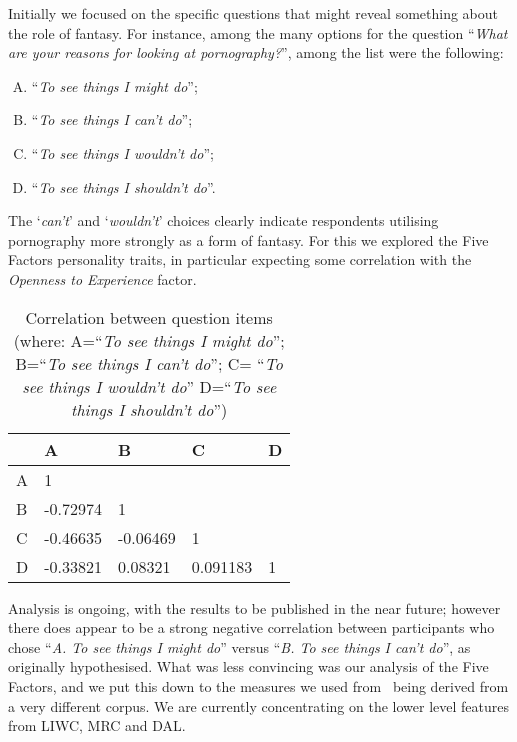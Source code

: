 \documentclass[letterpaper]{article}
\begin{document}
Initially we focused on the specific questions that might reveal
something about the role of fantasy. For instance, among the many
options for the question ``{\emph{What are your reasons for looking at
pornography?}}'', among the list were the following:

\begin{enumerate}[(A)]
\item ``{\emph{To see things I might do}}'';
\item ``{\emph{To see things I can't do}}'';
\item ``{\emph{To see things I wouldn't do}}'';
\item ``{\emph{To see things I shouldn't do}}''. 
\end{enumerate}

The `{\emph{can't}}' and `{\emph{wouldn't}}' choices clearly indicate
respondents utilising pornography more strongly as a form of
fantasy. For this we explored the Five Factors personality traits, in
particular expecting some correlation with the {\emph{Openness to
Experience}} factor.

\begin{table}[!htb]
\centering
\begin{tabularx}{\columnwidth}{l Y Y Y Y}
\hline
& A & B & C & D\\ 
\hline
A & 1 &  & & \\
B & -0.72974 & 1 & & \\
C & -0.46635 & -0.06469 & 1 & \\
D & -0.33821 & 0.08321 & 0.091183 & 1\\
\hline
\end{tabularx}
\caption{Correlation between question items (where: A=``{\emph{To
see things I might do}}''; B=``{\emph{To see things I can't do}}''; C=
``{\emph{To see things I wouldn't do}}'' D=``{\emph{To see
things I shouldn't do}}'')}
\label{tbl:abcd}
\end{table}

Analysis is ongoing, with the results to be published in the near
future; however there does appear to be a strong negative correlation
between participants who chose ``{\emph{A. To see things I might
do}}'' versus ``{\emph{B. To see things I can't do}}'', as originally
hypothesised. What was less convincing was our analysis of the Five
Factors, and we put this down to the measures we used
from~\cite{mairesse-et-al:2007} being derived from a very different
corpus. We are currently concentrating on the lower level features
from LIWC, MRC and DAL.
\end{document}
